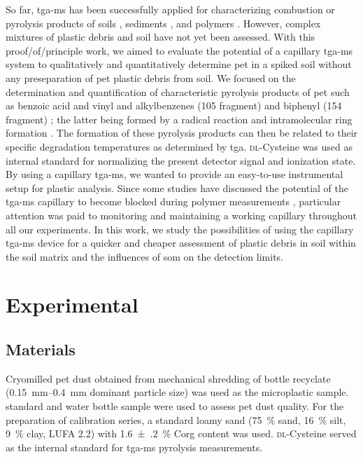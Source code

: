 So far, \ac{tga-ms} has been successfully applied for characterizing combustion or pyrolysis products of soils \citep{PallasserSoil2013,EdmondsonBlack2015,TamimiFate2017}, sediments \citep{FindorakovaAssessment2017}, and polymers \citep{PagaczThermal2015,SchindlerNovel2013}. However, complex mixtures of plastic debris and soil have not yet been assessed.
With this proof\-/of\-/principle work, we aimed to evaluate the potential of a capillary \ac{tga-ms} system to qualitatively and quantitatively determine \ac{pet} in a spiked soil without any preseparation of \ac{pet} plastic debris from soil.
We focused on the determination and quantification of characteristic pyrolysis products of \ac{pet} such as benzoic acid and vinyl and alkylbenzenes (\SI{105}{\mz} fragment) and biphenyl (\SI{154}{\mz} fragment) \citep{DumichenFast2017,DimitrovAnalysis2013,DuemichenAssessment2014}; the latter being formed by a radical reaction and intramolecular ring formation \citep{RichterFormation2000,KawaiCharacterization2008}.
The formation of these pyrolysis products can then be related to their specific degradation temperatures as determined by \ac{tga}. \textsc{dl}-Cysteine was used as internal standard for normalizing the present detector signal and ionization state.
By using a capillary \ac{tga-ms}, we wanted to provide an easy-to-use instrumental setup for plastic analysis. Since some studies have discussed the potential of the \ac{tga-ms} capillary to become blocked during polymer measurements \citep{SchindlerNovel2013,DuemichenAssessment2014}, particular attention was paid to monitoring and maintaining a working capillary throughout all our experiments.
In this work, we study the possibilities of using the capillary \ac{tga-ms} device for a quicker and cheaper assessment of plastic debris in soil within the soil matrix and the influences of \ac{som} on the detection limits.

\section{Experimental}

\subsection{Materials}

Cryomilled \ac{pet} dust obtained from mechanical shredding of bottle recyclate (\SIrange{0.15}{0.4}{\milli\meter} dominant particle size) was used as the microplastic sample.  standard and  water bottle sample were used to assess \ac{pet} dust quality.
For the preparation of calibration series, a standard loamy sand (\SI{75}{\percent} sand, \SI{16}{\percent} silt, \SI{9}{\percent} clay, LUFA 2.2) with \SI{1.6(2)}{\percent} \ac{Corg} content was used. \textsc{dl}-Cysteine served as the internal standard for \ac{tga-ms} pyrolysis measurements.

